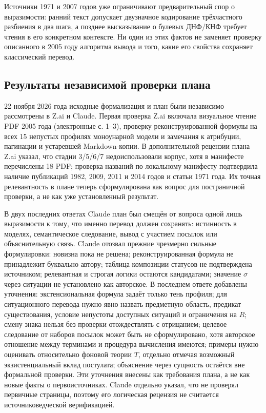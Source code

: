 \documentclass[12pt,a4paper]{article}
\begin{document}
Источники 1971 и 2007 годов уже ограничивают предварительный спор о выразимости: ранний текст допускает двузначное кодирование трёхчастного разбиения в два шага, а позднее высказывание о булевых ДНФ/КНФ требует чтения в его конкретном контексте. Ни один из этих фактов не заменяет проверку описанного в 2005 году алгоритма вывода и того, какие его свойства сохраняет классический перевод.

\subsection{Результаты независимой проверки плана}

22 ноября 2026 года исходные формализация и план были независимо рассмотрены в Z.ai и Claude. Первая проверка Z.ai включала визуальное чтение PDF 2005 года (электронные с. 1–3), проверку реконструированной формулы на всех 15 непустых профилях моноунарной модели и замечания к атрибуции, пагинации и устаревшей Markdown-копии. В дополнительной рецензии плана Z.ai указал, что стадии 3/5/6/7 недоиспользовали корпус, хотя в манифесте перечислены 18 PDF; проверка названий по локальному манифесту подтвердила наличие публикаций 1982, 2009, 2011 и 2014 годов и статьи 1971 года. Их точная релевантность в плане теперь сформулирована как вопрос для постраничной проверки, а не как уже установленный результат.

В двух последних ответах Claude план был смещён от вопроса одной лишь выразимости к тому, что именно перевод должен сохранять: истинность в моделях, семантическое следование, вывод с участием посылок или объяснительную связь. Claude отозвал прежние чрезмерно сильные формулировки: новизна пока не решена; реконструированная формула не принадлежит буквально автору; таблица композиции статусов не подтверждена источником; релевантная и строгая логики остаются кандидатами; значение \(\sigma\) через ситуации не установлено как авторское. В последнем ответе добавлены уточнения: экстенсиональная формула задаёт только тень профиля; для ситуационного перевода нужно явно назвать предметную область, предикат существования, условие непустоты доступных ситуаций и ограничения на \(R\); смену знака нельзя без проверки отождествлять с отрицанием; целевое следование от наборов посылок может быть не сформулировано, хотя авторское отношение между терминами и процедура вычисления имеются; примеры нужно оценивать относительно фоновой теории \(T\), отдельно отмечая возможный экзистенциальный вклад постулата; объяснение через сущность остаётся вне формальной проверки. Эти уточнения внесены как требования плана, а не как новые факты о первоисточниках. Claude отдельно указал, что не проверял первичные страницы, поэтому его логическая рецензия не считается источниковедческой верификацией.
\end{document}
